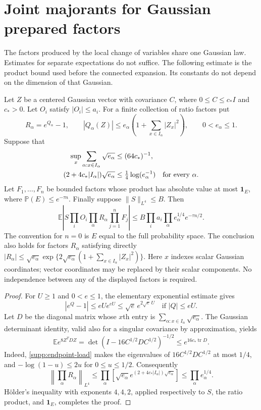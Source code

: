 \section{Joint majorants for Gaussian prepared factors}
\label{supp:joint-majorants}

The factors produced by the local change of variables share one Gaussian
law.  Estimates for separate expectations do not suffice.  The following
estimate is the product bound used before the connected expansion.  Its constants do not depend on the dimension of that Gaussian.

\begin{lemma}
\label{supp:gaussian-product}
Let $Z$ be a centered Gaussian vector with covariance $C$, where
$0\le C\le c_*I$ and $c_*>0$.  Let $O_i$ satisfy $|O_i|\le a_i$.
For a finite collection of ratio factors put
\[
 R_\alpha=e^{Q_\alpha}-1,\qquad
 |Q_\alpha(Z)|\le e_\alpha
       \left(1+\sum_{x\in I_\alpha}|Z_x|^2\right),
 \qquad 0<e_\alpha\le1.
\]
Suppose that
\begin{align}
 \sup_x\sum_{\alpha:x\in I_\alpha}\sqrt{e_\alpha}
       &\le(64c_*)^{-1},\label{supp:endpoint-load}\\
 (2+4c_*|I_\alpha|)\sqrt{e_\alpha}
       &\le\tfrac14\log(e_\alpha^{-1})
       \quad\hbox{for every }\alpha.\label{supp:ratio-size}
\end{align}
Let $F_1,\ldots,F_n$ be bounded factors whose product has absolute
value at most $\mathbf1_E$, where
$\mathbb P(E)\le e^{-\tau n}$.  Finally suppose $\|S\|_{L^4}\le B$.
Then
\[
 \mathbb E\left|S\prod_iO_i\prod_\alpha R_\alpha
                         \prod_{j=1}^nF_j\right|
 \le B\prod_i a_i\prod_\alpha e_\alpha^{1/4}
                                      e^{-\tau n/2}.
\]
The convention for $n=0$ is $E$ equal to the full probability space.
The conclusion also holds for factors $R_\alpha$ satisfying directly
$|R_\alpha|\le\sqrt{e_\alpha}\exp\{2\sqrt{e_\alpha}
(1+\sum_{x\in I_\alpha}|Z_x|^2)\}$.
Here $x$ indexes scalar Gaussian coordinates; vector coordinates may be
replaced by their scalar components.
No independence between any of the displayed factors is required.
\end{lemma}

\begin{proof}
For $U\ge1$ and $0<e\le1$, the elementary exponential estimate gives
\[
 |e^Q-1|\le eUe^{eU}\le\sqrt e\,e^{2\sqrt e\,U}
 \quad\text{if }|Q|\le eU.
\]
Let $D$ be the diagonal matrix whose $x$th entry is
$\sum_{\alpha:x\in I_\alpha}\sqrt{e_\alpha}$.
The Gaussian determinant identity, valid also for a singular covariance
by approximation, yields
\[
 \mathbb E e^{8Z^TDZ}
 =\det(I-16C^{1/2}DC^{1/2})^{-1/2}
 \le e^{16c_*\operatorname{tr}D}.
\]
Indeed, \eqref{supp:endpoint-load} makes the eigenvalues of
$16C^{1/2}DC^{1/2}$ at most $1/4$, and
$-\log(1-u)\le2u$ for $0\le u\le1/2$.
Consequently
\[
 \left\|\prod_\alpha R_\alpha\right\|_{L^4}
 \le\prod_\alpha\left[\sqrt{e_\alpha}
       e^{(2+4c_*|I_\alpha|)\sqrt{e_\alpha}}\right]
 \le\prod_\alpha e_\alpha^{1/4}.
\]
H\"older's inequality with exponents $4,4,2$, applied respectively to
$S$, the ratio product, and $\mathbf1_E$, completes the proof.
\end{proof}

